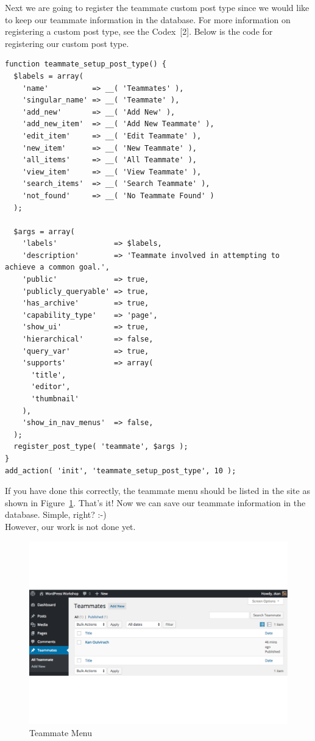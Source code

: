 \documentclass{article}
\begin{document}
\noindent Next we are going to register the teammate custom post type since we
would like to keep our teammate information in the database. For more
information on registering a custom post type, see the Codex~[2]. Below is the
code for registering our custom post type.

\begin{verbatim}
function teammate_setup_post_type() {
  $labels = array(
    'name'          => __( 'Teammates' ),
    'singular_name' => __( 'Teammate' ),
    'add_new'       => __( 'Add New' ),
    'add_new_item'  => __( 'Add New Teammate' ),
    'edit_item'     => __( 'Edit Teammate' ),
    'new_item'      => __( 'New Teammate' ),
    'all_items'     => __( 'All Teammate' ),
    'view_item'     => __( 'View Teammate' ),
    'search_items'  => __( 'Search Teammate' ),
    'not_found'     => __( 'No Teammate Found' )
  );

  $args = array(
    'labels'             => $labels,
    'description'        => 'Teammate involved in attempting to achieve a common goal.',
    'public'             => true,
    'publicly_queryable' => true,
    'has_archive'        => true,
    'capability_type'    => 'page',
    'show_ui'            => true,
    'hierarchical'       => false,
    'query_var'          => true,
    'supports'           => array(
      'title',
      'editor',
      'thumbnail'
    ),
    'show_in_nav_menus'  => false,
  );
  register_post_type( 'teammate', $args );
}
add_action( 'init', 'teammate_setup_post_type', 10 );
\end{verbatim}

\noindent If you have done this correctly, the teammate menu should be listed
in the site as shown in Figure~\ref{fig:teammate-menu}. That's it! Now we can
save our teammate information in the database. Simple, right? :-) \\

\noindent However, our work is not done yet.

\begin{figure}[t]
    \centering
    \includegraphics[width=6in]{figures/teammate-menu}
    \caption{Teammate Menu}
    \label{fig:teammate-menu}
\end{figure}
\end{document}
